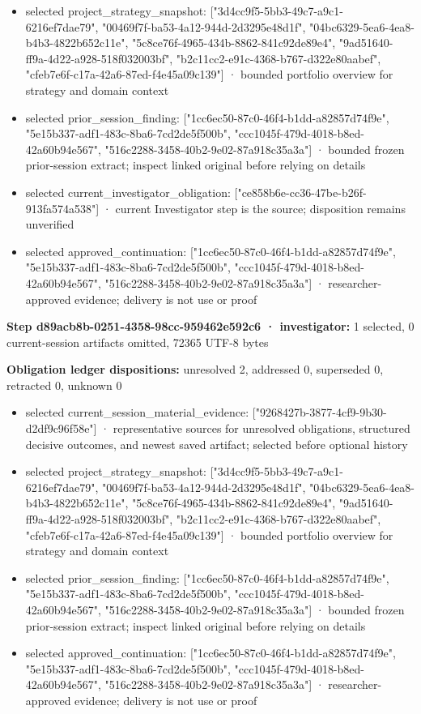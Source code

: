 \documentclass[11pt]{article}
\begin{document}
\begin{itemize}
\item selected project\_strategy\_snapshot: ["3d4cc9f5-5bb3-49c7-a9c1-6216ef7dae79", "00469f7f-ba53-4a12-944d-2d3295e48d1f", "04bc6329-5ea6-4ea8-b4b3-4822b652c11e", "5c8ce76f-4965-434b-8862-841c92de89e4", "9ad51640-ff9a-4d22-a928-518f032003bf", "b2c11cc2-e91c-4368-b767-d322e80aabef", "cfeb7e6f-c17a-42a6-87ed-f4e45a09c139"] · bounded portfolio overview for strategy and domain context
\item selected prior\_session\_finding: ["1cc6ec50-87c0-46f4-b1dd-a82857d74f9e", "5e15b337-adf1-483c-8ba6-7cd2de5f500b", "ccc1045f-479d-4018-b8ed-42a60b94e567", "516c2288-3458-40b2-9e02-87a918c35a3a"] · bounded frozen prior-session extract; inspect linked original before relying on details
\item selected current\_investigator\_obligation: ["ce858b6e-cc36-47be-b26f-913fa574a538"] · current Investigator step is the source; disposition remains unverified
\item selected approved\_continuation: ["1cc6ec50-87c0-46f4-b1dd-a82857d74f9e", "5e15b337-adf1-483c-8ba6-7cd2de5f500b", "ccc1045f-479d-4018-b8ed-42a60b94e567", "516c2288-3458-40b2-9e02-87a918c35a3a"] · researcher-approved evidence; delivery is not use or proof
\end{itemize}
\textbf{Step d89acb8b-0251-4358-98cc-959462e592c6 · investigator:} 1 selected, 0 current-session artifacts omitted, 72365 UTF-8 bytes\par
\textbf{Obligation ledger dispositions:} unresolved 2, addressed 0, superseded 0, retracted 0, unknown 0\par
\begin{itemize}
\item selected current\_session\_material\_evidence: ["9268427b-3877-4cf9-9b30-d2df9c96f58e"] · representative sources for unresolved obligations, structured decisive outcomes, and newest saved artifact; selected before optional history
\item selected project\_strategy\_snapshot: ["3d4cc9f5-5bb3-49c7-a9c1-6216ef7dae79", "00469f7f-ba53-4a12-944d-2d3295e48d1f", "04bc6329-5ea6-4ea8-b4b3-4822b652c11e", "5c8ce76f-4965-434b-8862-841c92de89e4", "9ad51640-ff9a-4d22-a928-518f032003bf", "b2c11cc2-e91c-4368-b767-d322e80aabef", "cfeb7e6f-c17a-42a6-87ed-f4e45a09c139"] · bounded portfolio overview for strategy and domain context
\item selected prior\_session\_finding: ["1cc6ec50-87c0-46f4-b1dd-a82857d74f9e", "5e15b337-adf1-483c-8ba6-7cd2de5f500b", "ccc1045f-479d-4018-b8ed-42a60b94e567", "516c2288-3458-40b2-9e02-87a918c35a3a"] · bounded frozen prior-session extract; inspect linked original before relying on details
\item selected approved\_continuation: ["1cc6ec50-87c0-46f4-b1dd-a82857d74f9e", "5e15b337-adf1-483c-8ba6-7cd2de5f500b", "ccc1045f-479d-4018-b8ed-42a60b94e567", "516c2288-3458-40b2-9e02-87a918c35a3a"] · researcher-approved evidence; delivery is not use or proof
\end{itemize}
\end{document}
